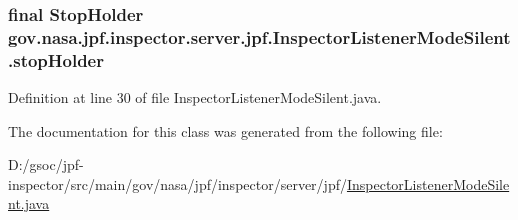 \subsubsection[{\texorpdfstring{stop\+Holder}{stopHolder}}]{\setlength{\rightskip}{0pt plus 5cm}final {\bf Stop\+Holder} gov.\+nasa.\+jpf.\+inspector.\+server.\+jpf.\+Inspector\+Listener\+Mode\+Silent.\+stop\+Holder\hspace{0.3cm}{\ttfamily [private]}}\hypertarget{classgov_1_1nasa_1_1jpf_1_1inspector_1_1server_1_1jpf_1_1_inspector_listener_mode_silent_ac59c21ef323985571d0e0d5bf643e17c}{}\label{classgov_1_1nasa_1_1jpf_1_1inspector_1_1server_1_1jpf_1_1_inspector_listener_mode_silent_ac59c21ef323985571d0e0d5bf643e17c}


Definition at line 30 of file Inspector\+Listener\+Mode\+Silent.\+java.



The documentation for this class was generated from the following file\+:\begin{DoxyCompactItemize}
\item 
D\+:/gsoc/jpf-\/inspector/src/main/gov/nasa/jpf/inspector/server/jpf/\hyperlink{_inspector_listener_mode_silent_8java}{Inspector\+Listener\+Mode\+Silent.\+java}\end{DoxyCompactItemize}

